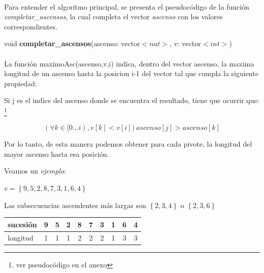 \paragraph{}
Para entender el algoritmo principal, se presenta el pseudocódigo de la función \textit{completar\_ascensos}, la cual completa el vector \textit{ascenso} con los valores correspondientes.

\incmargin{1em}
\linesnumbered
{}

\begin{algorithm}[H]
	void  \textbf{completar\_ascensos}(ascenso: vector$<nat>$, v: vector$<int>$)\\
	\BlankLine		
	\BlankLine		
	\BlankLine		


\end{algorithm}
	

\paragraph{}
La función maximoAsc(ascenso,v,i) indica, dentro del vector ascenso, la maxima longitud de un ascenso hasta la posicion i-1 del vector tal que cumpla la siguiente propiedad:

\vspace*{1cm}

Si j es el indice del ascenso donde se encuentra el resultado, tiene que ocurrir que: \footnote{ver pseudocódigo en el anexo}

$$(\forall k \in [0...i) , v[k]<v[i]) \  ascenso[j] > ascenso[k]$$


Por lo tanto, de esta manera podemos obtener para cada pivote, la longitud del mayor ascenso hasta esa posición.

\vspace*{1cm}
Veamos un \textit{ejemplo}:

$v = \left\lbrace 9,5,2,8,7,3,1,6,4\right\rbrace$ 

Las subsecuencias ascendentes más largas son $\left\lbrace 2,3,4\right\rbrace$ o $\left\lbrace 2,3,6\right\rbrace$

\begin{center}
   \begin{tabular}{| l | c | c |c |c |c |c |c |c |c | }
     \hline
     sucesión & 9 & 5 & 2 & 8 & 7 & 3 & 1 & 6 & 4 \\ \hline
     longitud & 1& 1& 1& 2& 2& 2& 1 &3 & 3 \\ \hline
     
     \hline
   \end{tabular}
 \end{center}

